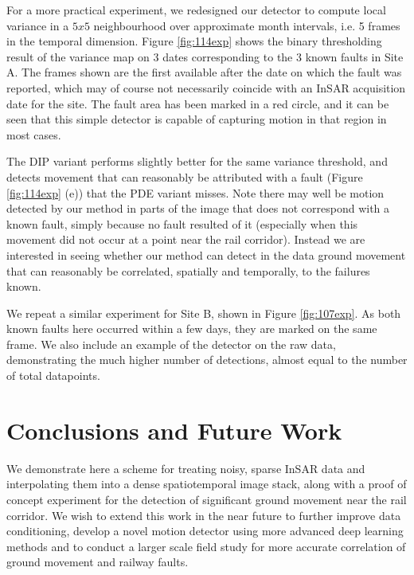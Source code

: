 \documentclass{article}
\begin{document}
For a more practical experiment, we redesigned our detector to compute local variance in a $5x5$ neighbourhood over approximate month intervals, i.e. 5 frames in the temporal dimension. Figure \ref{fig:114exp} shows the binary thresholding result of the variance map on 3 dates corresponding to the 3 known faults in Site A. The frames shown are the first available after the date on which the fault was reported, which may of course not necessarily coincide with an InSAR acquisition date for the site. The fault area has been marked in a red circle, and it can be seen that this simple detector is capable of capturing motion in that region in most cases.

The DIP variant performs slightly better for the same variance threshold, and detects movement that can reasonably be attributed with a fault (Figure \ref{fig:114exp} (e)) that the PDE variant misses. Note there may well be motion detected by our method in parts of the image that does not correspond with a known fault, simply because no fault resulted of it (especially when this movement did not occur at a point near the rail corridor). Instead we are interested in seeing whether our method can detect in the data ground movement that can reasonably be correlated, spatially and temporally, to the failures known.

We repeat a similar experiment for Site B, shown in Figure \ref{fig:107exp}. As both known faults here occurred within a few days, they are marked on the same frame. We also include an example of the detector on the raw data, demonstrating the much higher number of detections, almost equal to the number of total datapoints.



\section{Conclusions and Future Work}

We demonstrate here a scheme for treating noisy, sparse InSAR data and interpolating them into a dense spatiotemporal image stack, along with a proof of concept experiment for the detection of significant ground movement near the rail corridor. We wish to extend this work in the near future to further improve data conditioning, develop a novel motion detector using more advanced deep learning methods and to conduct a larger scale field study for more accurate correlation of ground movement and railway faults.

\vfill\pagebreak


\clearpage
\balance



\end{document}
